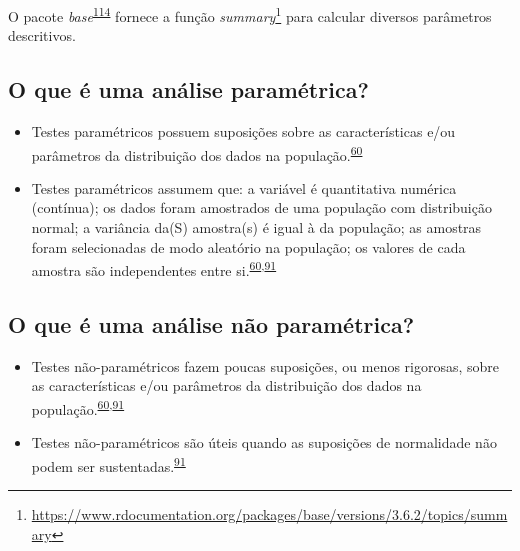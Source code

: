 \documentclass[
  a4paper,
]{book}
\renewcommand{\href}[2]{#2\footnote{\url{#1}}}
\newenvironment{infobox}[1]
  {
  \begin{itemize}
  \renewcommand{\labelitemi}{
    \raisebox{-.7\height}[0pt][0pt]{
      {\setkeys{Gin}{width=3em,keepaspectratio}
        \texttt{[image: \#1]}}
    }
  }
  \setlength{\fboxsep}{1em}
  \begin{blackbox}
  \item
  }
  {
  \end{blackbox}
  \end{itemize}
  }
\begin{document}
\begin{infobox}{images/Rlogo}
O pacote \emph{base}\textsuperscript{\protect\hyperlink{ref-base-6}{114}} fornece a função \href{https://www.rdocumentation.org/packages/base/versions/3.6.2/topics/summary}{\emph{summary}} para calcular diversos parâmetros descritivos.

\end{infobox}

\hypertarget{o-que-uxe9-uma-anuxe1lise-paramuxe9trica}{%
\subsection{O que é uma análise paramétrica?}\label{o-que-uxe9-uma-anuxe1lise-paramuxe9trica}}

\begin{itemize}
\item
  Testes paramétricos possuem suposições sobre as características e/ou parâmetros da distribuição dos dados na população.\textsuperscript{\protect\hyperlink{ref-vetter2017}{60}}
\item
  Testes paramétricos assumem que: a variável é quantitativa numérica (contínua); os dados foram amostrados de uma população com distribuição normal; a variância da(S) amostra(s) é igual à da população; as amostras foram selecionadas de modo aleatório na população; os valores de cada amostra são independentes entre si.\textsuperscript{\protect\hyperlink{ref-vetter2017}{60},\protect\hyperlink{ref-Ali2016}{91}}
\end{itemize}

\hypertarget{o-que-uxe9-uma-anuxe1lise-nuxe3o-paramuxe9trica}{%
\subsection{O que é uma análise não paramétrica?}\label{o-que-uxe9-uma-anuxe1lise-nuxe3o-paramuxe9trica}}

\begin{itemize}
\item
  Testes não-paramétricos fazem poucas suposições, ou menos rigorosas, sobre as características e/ou parâmetros da distribuição dos dados na população.\textsuperscript{\protect\hyperlink{ref-vetter2017}{60},\protect\hyperlink{ref-Ali2016}{91}}
\item
  Testes não-paramétricos são úteis quando as suposições de normalidade não podem ser sustentadas.\textsuperscript{\protect\hyperlink{ref-Ali2016}{91}}
\end{itemize}
\end{document}
